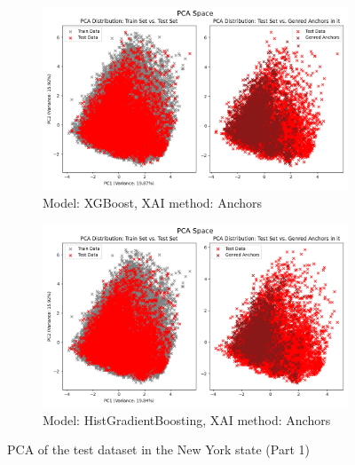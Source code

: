 \begin{figure}[h]
    \centering
    \begin{subfigure}[b]{0.9\textwidth}
        \includegraphics[width=\textwidth]{Images/pca/pca_xg_ny_anchors.png}
        \caption{Model: XGBoost, XAI method: Anchors}
        \label{fig:pca_xg_ny_anchors}
    \end{subfigure}
    \hfill
    \begin{subfigure}[b]{0.9\textwidth}
        \includegraphics[width=\textwidth]{Images/pca/pca_skrub_ny_anchors.png}
        \caption{Model: HistGradientBoosting, XAI method: Anchors}
        \label{fig:pca_skrub_ny_anchors}
    \end{subfigure}
\caption{PCA of the test dataset in the New York state (Part 1)}
 \end{figure}


